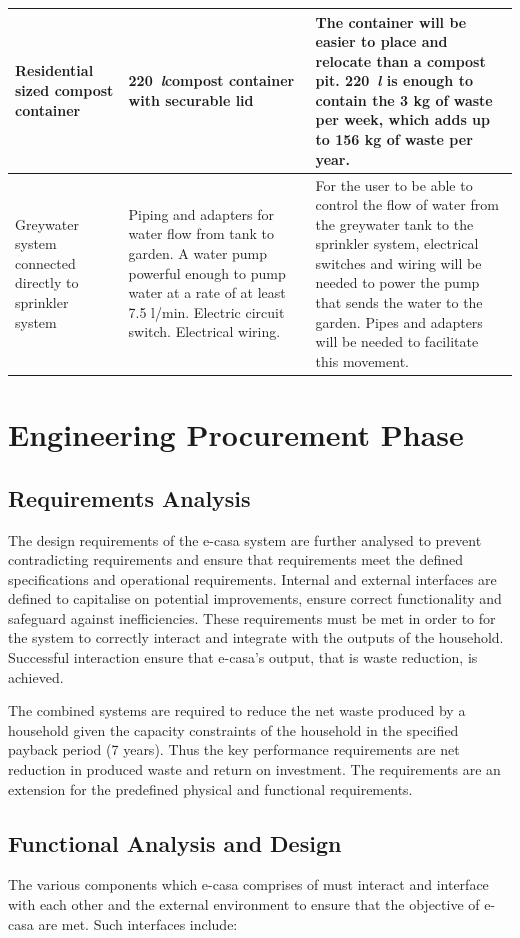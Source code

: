 \documentclass[a4paper,11pt,fleqn]{report}
\begin{document}
\begin{table}[h!]
\begin{center}
\begin{tabular}{p{4.5cm}|p{4.5cm}|p{4.5cm}}
            \hline
    Residential sized compost container & 220~\textit{l}compost container with securable lid  & The container will be easier to place and relocate than a compost pit. 220~\textit{l} is enough to contain the 3 kg of waste per week, which adds up to 156 kg of waste per year.\\
            \hline
    Greywater system connected directly to sprinkler system & Piping and adapters for water flow from tank to garden. A water pump powerful enough to pump water at a rate of at least 7.5 l/min. Electric circuit switch. Electrical wiring.  & For the user to be able to control the flow of water from the greywater tank to the sprinkler system, electrical switches and wiring will be needed to power the pump that sends the water to the garden. Pipes and adapters will be needed to facilitate this movement.\\

    \bottomrule
\end{tabular}
\end{center}
\end{table}
%
\section{Engineering Procurement Phase}
\subsection{Requirements Analysis}
The design requirements of the e-casa system are further analysed to prevent contradicting requirements and ensure that requirements meet the defined specifications and operational requirements. Internal and external interfaces are defined to capitalise on potential improvements, ensure correct functionality and safeguard against inefficiencies. These requirements must be met in order to for the system to correctly interact and integrate with the outputs of the household. Successful interaction ensure that e-casa’s output, that is waste reduction, is achieved.

The combined systems are required to reduce the net waste produced by a household given the capacity constraints of the household in the specified payback period (7 years). Thus the key performance requirements are net reduction in produced waste and return on investment. The requirements are an extension for the predefined physical and functional requirements.


\subsection{Functional Analysis and Design}
The various components which e-casa comprises of must interact and interface with each other and the external environment to ensure that the objective of e-casa are met. Such interfaces include:\\
\end{document}
